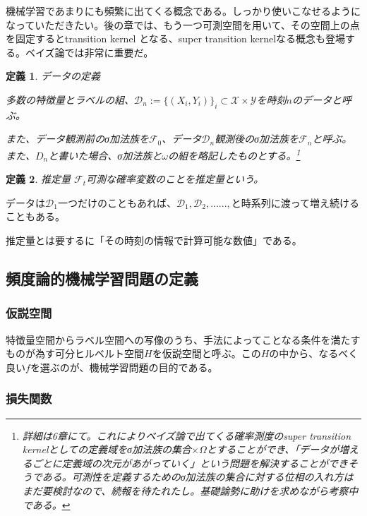 \documentclass{jsarticle}
\newtheorem{defi}{定義}[section]
\begin{document}
機械学習であまりにも頻繁に出てくる概念である。しっかり使いこなせるようになっていただきたい。後の章では、もう一つ可測空間を用いて、その空間上の点を固定するとtransition kernel となる、super transition kernelなる概念も登場する。ベイズ論では非常に重要だ。

\begin{defi} データの定義

多数の特徴量とラベルの組、$\mathcal{D}_n:=\{(X_i,Y_i)\}_i\subset \mathcal{X}\times \mathcal{Y}$を時刻$n$のデータと呼ぶ。

また、データ観測前のσ加法族を$\mathcal{F}_0$、データ$\mathcal{D}_n$観測後のσ加法族を$\mathcal{F}_n$と呼ぶ。また、$D_n$と書いた場合、σ加法族と$\omega$の組を略記したものとする。\footnote{詳細は6章にて。これによりベイズ論で出てくる確率測度のsuper transition kernelとしての定義域をσ加法族の集合$\times\Omega$とすることができ、「データが増えるごとに定義域の次元があがっていく」という問題を解決することができそうである。可測性を定義するためのσ加法族の集合に対する位相の入れ方はまだ要検討なので、続報を待たれたし。基礎論勢に助けを求めながら考察中である。}


\end{defi}
\begin{defi} 推定量
$\mathcal{F}_t$可測な確率変数のことを推定量という。
\end{defi}

データは$\mathcal{D}_1$一つだけのこともあれば、$\mathcal{D}_1,\mathcal{D}_2,......,$と時系列に渡って増え続けることもある。

推定量とは要するに「その時刻の情報で計算可能な数値」である。

\subsection{頻度論的機械学習問題の定義}



\subsubsection{仮説空間}

特徴量空間からラベル空間への写像のうち、手法によってことなる条件を満たすものが為す可分ヒルベルト空間$H$を仮説空間と呼ぶ。この$H$の中から、なるべく良い$f$を選ぶのが、機械学習問題の目的である。



\subsubsection{損失関数}
\end{document}
